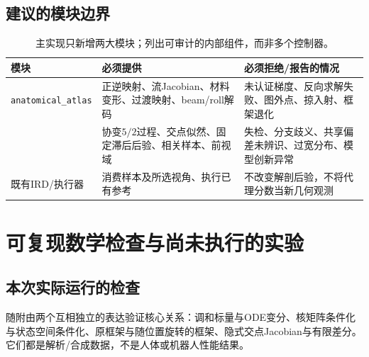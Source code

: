 \documentclass[UTF8,11pt,a4paper,fontset=fandol]{ctexart}
\numberwithin{equation}{section}
\theoremstyle{plain}
\theoremstyle{definition}
\theoremstyle{remark}
\begin{document}
\subsection{建议的模块边界}
\begin{table}[H]
\centering\small
\caption{主实现只新增两大模块；列出可审计的内部组件，而非多个控制器。}
\begin{tabularx}{\textwidth}{P{29mm}YY}
\toprule
模块 & 必须提供 & 必须拒绝/报告的情况\\
\midrule
\texttt{anatomical\_atlas} & 正逆映射、流Jacobian、材料变形、过渡映射、beam/roll解码 & 未认证梯度、反向求解失败、图外点、掠入射、框架退化\\
 & 协变$5/2$过程、交点似然、固定滞后后验、相关样本、前视域 & 失检、分支歧义、共享偏差未辨识、过宽分布、模型创新异常\\
既有IRD/执行器 & 消费样本及所选视角、执行已有参考 & 不改变解剖后验，不将代理分数当新几何观测\\
\bottomrule
\end{tabularx}
\end{table}

\section{可复现数学检查与尚未执行的实验}\label{sec:experiments}
\subsection{本次实际运行的检查}
随附由两个互相独立的表达验证核心关系：调和标量与ODE变分、核矩阵条件化与状态空间条件化、原框架与随位置旋转的框架、隐式交点Jacobian与有限差分。它们都是解析/合成数据，不是人体或机器人性能结果。
\end{document}
